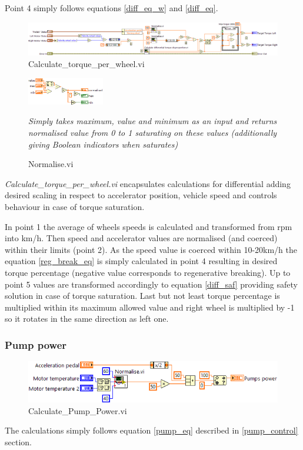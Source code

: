 Point 4 simply follows equations \ref{diff_eq_w} and \ref{diff_eq}.

\begin{figure}[H]
    \centering
    \includegraphics[scale=\visc,max width=\textwidth]{figures/Calculate_torque_per_wheeld}
    \caption{Calculate\_torque\_per\_wheel.vi}
    \label{vi:Calculate_torque_per_wheel}
\end{figure}

\begin{figure}
    \centering
    \includegraphics[scale=\visc,max width=0.3\textwidth]{figures/Normalised}
    \caption{Normalise.vi}
    \label{vi:Normalise}
    \medskip
    \small
    \textit{Simply takes maximum, value and minimum as an input and returns normalised value from 0 to 1 saturating on these values (additionally giving Boolean indicators when saturates)}
\end{figure}
\textit{Calculate\_torque\_per\_wheel.vi} encapsulates calculations for differential adding desired scaling in respect to accelerator position, vehicle speed and controls behaviour in case of torque saturation.

In point 1 the average of wheels speeds is calculated and transformed from rpm into km/h. Then speed and accelerator values are normalised (and coerced) within their limits (point 2). As the speed value is coerced within 10-20km/h the equation \ref{reg_break_eq} is simply calculated in point 4 resulting in desired torque percentage (negative value corresponds to regenerative breaking). Up to point 5 values are transformed accordingly to equation \ref{diff_saf} providing safety solution in case of torque saturation. Last but not least torque percentage is multiplied within its maximum allowed value and right wheel is multiplied by -1 so it rotates in the same direction as left one.

\subsubsection{Pump power}
\begin{figure}[H]
    \centering
    \includegraphics[scale=\visc,max width=\textwidth]{figures/Calculate_Pump_Powerd}
    \caption{Calculate\_Pump\_Power.vi}
    \label{vi:Calculate_Pump_Power}
\end{figure}
The calculations simply follows equation \ref{pump_eq} described in \ref{pump_control} section.

